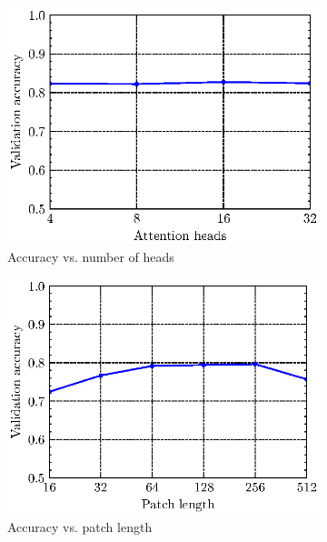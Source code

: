 \documentclass[12pt, hidelinks]{article}
\begin{document}
\begin{figure}
\begin{subfigure}[b]{0.45\textwidth}
        \includegraphics[width=\textwidth]{assets/acc_vs_hyperparam/att_head.eps}
        \caption{Accuracy vs. number of heads}
        \label{fig:att_heads}
    \end{subfigure}
    \hfill
    \begin{subfigure}[b]{0.45\textwidth}
        \includegraphics[width=\textwidth]{assets/acc_vs_hyperparam/patch_len.eps}
        \caption{Accuracy vs. patch length}
        \label{fig:patch_len_acc}
    \end{subfigure}
    \vfill
    \begin{subfigure}[b]{0.45\textwidth}

\end{subfigure}
\end{figure}
\end{document}
